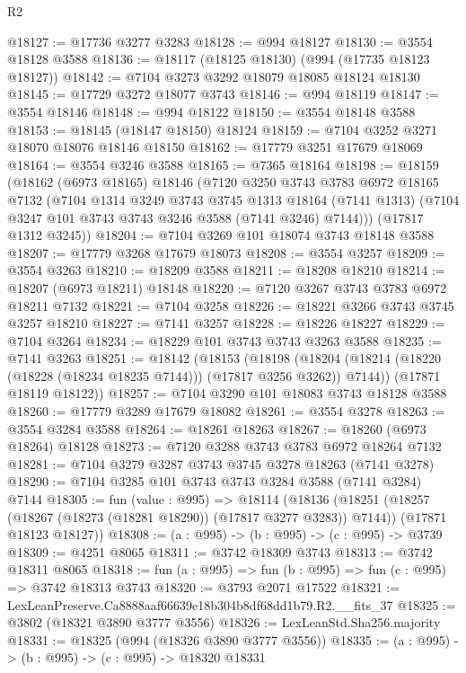 \begin{lexlean}{R2}
\begin{coremodule}
@18127 := @17736 @3277 @3283
@18128 := @994 @18127
@18130 := @3554 @18128 @3588
@18136 := @18117 (@18125 @18130) (@994 (@17735 @18123 @18127))
@18142 := @7104 @3273 @3292 @18079 @18085 @18124 @18130
@18145 := @17729 @3272 @18077 @3743
@18146 := @994 @18119
@18147 := @3554 @18146
@18148 := @994 @18122
@18150 := @3554 @18148 @3588
@18153 := @18145 (@18147 @18150) @18124
@18159 := @7104 @3252 @3271 @18070 @18076 @18146 @18150
@18162 := @17779 @3251 @17679 @18069
@18164 := @3554 @3246 @3588
@18165 := @7365 @18164
@18198 := @18159
    (@18162
      (@6973 @18165)
      @18146
      (@7120
        @3250
        @3743
        @3783
        @6972
        @18165
        @7132
        (@7104
          @1314
          @3249
          @3743
          @3745
          @1313
          @18164
          (@7141 @1313)
          (@7104 @3247 @101 @3743 @3743 @3246 @3588 (@7141 @3246) @7144)))
      (@17817 @1312 @3245))
@18204 := @7104 @3269 @101 @18074 @3743 @18148 @3588
@18207 := @17779 @3268 @17679 @18073
@18208 := @3554 @3257
@18209 := @3554 @3263
@18210 := @18209 @3588
@18211 := @18208 @18210
@18214 := @18207 (@6973 @18211) @18148
@18220 := @7120 @3267 @3743 @3783 @6972 @18211 @7132
@18221 := @7104 @3258
@18226 := @18221 @3266 @3743 @3745 @3257 @18210
@18227 := @7141 @3257
@18228 := @18226 @18227
@18229 := @7104 @3264
@18234 := @18229 @101 @3743 @3743 @3263 @3588
@18235 := @7141 @3263
@18251 := @18142
    (@18153
      (@18198 (@18204 (@18214 (@18220 (@18228 (@18234 @18235 @7144))) (@17817 @3256 @3262)) @7144))
      (@17871 @18119 @18122))
@18257 := @7104 @3290 @101 @18083 @3743 @18128 @3588
@18260 := @17779 @3289 @17679 @18082
@18261 := @3554 @3278
@18263 := @3554 @3284 @3588
@18264 := @18261 @18263
@18267 := @18260 (@6973 @18264) @18128
@18273 := @7120 @3288 @3743 @3783 @6972 @18264 @7132
@18281 := @7104 @3279 @3287 @3743 @3745 @3278 @18263 (@7141 @3278)
@18290 := @7104 @3285 @101 @3743 @3743 @3284 @3588 (@7141 @3284) @7144
@18305 := fun (value : @995) =>
  @18114
    (@18136
      (@18251 (@18257 (@18267 (@18273 (@18281 @18290)) (@17817 @3277 @3283)) @7144))
      (@17871 @18123 @18127))
@18308 := (a : @995) -> (b : @995) -> (c : @995) -> @3739
@18309 := @4251 @8065
@18311 := @3742 @18309 @3743
@18313 := @3742 @18311 @8065
@18318 := fun (a : @995) => fun (b : @995) => fun (c : @995) => @3742 @18313 @3743
@18320 := @3793 @2071 @17522
@18321 := LexLeanPreserve.Ca8888aaf66639e18b304b8df68dd1b79.R2.__fits_37
@18325 := @3802 (@18321 @3890 @3777 @3556)
@18326 := LexLeanStd.Sha256.majority
@18331 := @18325 (@994 (@18326 @3890 @3777 @3556))
@18335 := (a : @995) -> (b : @995) -> (c : @995) -> @18320 @18331

\end{coremodule}
\end{lexlean}
